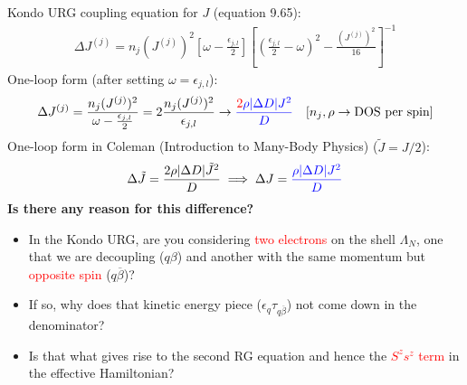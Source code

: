 \documentclass[12pt,aspectratio=169]{beamer}
\newcommand{\qs}[1]{\textbf{\textcolor{bottlegreen}{#1}}}
\begin{document}
\begin{frame}
Kondo URG coupling equation for \(J\) (equation 9.65):
\begin{equation*}
\begin{aligned}
	\Delta J^{(j)}=n_{j}(J^{(j)})^{2}\left[\omega- \frac{\epsilon_{j,l}}{2}\right]\left[(\frac{\epsilon_{j,l}}{2}-\omega)^{2}-\frac{\left(J^{(j)}\right)^{2}}{16}\right]^{-1}
\end{aligned}
\end{equation*}
One-loop form (after setting \(\omega = \epsilon_{j,l}\)):
\begin{equation*}
\begin{aligned}
	\Delta J^{(j)}= \frac{n_{j}(J^{(j)})^{2}}{\omega-\frac{\epsilon_{j,l}}{2}} = 2\frac{n_{j}(J^{(j)})^{2}}{\epsilon_{j,l}} \rightarrow \textcolor{blue}{\frac{\textcolor{red}{2} \rho |\Delta D| J^2}{D}} && [n_j, \rho \rightarrow \text{DOS per spin}]
\end{aligned}
\end{equation*}
One-loop form in Coleman (Introduction to Many-Body Physics) (\(\tilde J = J/2\)):
\begin{equation*}
\begin{aligned}
	\Delta \tilde J = \frac{2 \rho |\Delta D| \tilde J^2}{D} \implies \Delta J = \textcolor{blue}{\frac{\rho |\Delta D| J^2}{D}}
\end{aligned}
\end{equation*}
\qs{Is there any reason for this difference?}
\end{frame}

\begin{frame}
	\begin{itemize}
		\item In the Kondo URG, are you considering \textcolor{red}{two electrons} on the shell \(\Lambda_N\), one that we are decoupling (\(q\beta\)) and another with the same momentum but \textcolor{red}{opposite spin} (\(q\overline\beta\))? \\[30pt]
		\item If so, why does that kinetic energy piece (\(\epsilon_q \tau_{q\overline\beta}\)) not come down in the denominator?\\[30pt]
		\item Is that what gives rise to the second RG equation and hence the \textcolor{red}{\(S^z s^z\) term} in the effective Hamiltonian?
	\end{itemize}
\end{frame}
\end{document}
